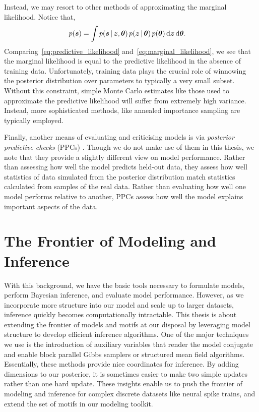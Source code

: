 Instead, we may resort to other methods of approximating the marginal
likelihood. Notice that,
\begin{align}
  \label{eq:marginal_likelihood}
  p(\boldsymbol{s})
  &= \int p(\boldsymbol{s} \,|\, \boldsymbol{z}, \boldsymbol{\theta}) \,
  p(\boldsymbol{z} \,|\, \boldsymbol{\theta}) \,
  p(\boldsymbol{\theta}) \,
  \mathrm{d}\boldsymbol{z} \, \mathrm{d} \boldsymbol{\theta}.
\end{align}
Comparing~\eqref{eq:predictive_likelihood} and~\eqref{eq:marginal_likelihood},
we see that the marginal likelihood is equal to the predictive likelihood
in the absence of training data. Unfortunately, training data plays the crucial
role of winnowing the posterior distribution over parameters to typically
a very small subset. Without this constraint, simple Monte Carlo estimates
like those used to approximate the predictive likelihood will suffer from
extremely high variance. Instead, more sophisticated methods, like annealed
importance sampling \cite{neal2001annealed} are typically employed. 

Finally, another means of evaluating and criticising models is via
\emph{posterior predictive checks} (PPCs) \cite{box1980sampling,
  Gelman13, blei2014build}.  Though we do not make use of them in this
thesis, we note that they provide a slightly different view on model
performance. Rather than assessing how well the model predicts
held-out data, they assess how well statistics of data simulated from
the posterior distribution match statistics calculated from samples of
the real data. Rather than evaluating how well one model performs
relative to another, PPCs assess how well the model explains important
aspects of the data.

\section{The Frontier of Modeling and Inference}
With this background, we have the basic tools necessary to formulate
models, perform Bayesian inference, and evaluate model performance.
However, as we incorporate more structure into our model and scale up
to larger datasets, inference quickly becomes computationally
intractable. This thesis is about extending the frontier of models and
motifs at our disposal by leveraging model structure to develop
efficient inference algorithms. One of the major techniques we use is
the introduction of auxiliary variables that render the model
conjugate and enable block parallel Gibbs samplers or structured mean
field algorithms. Essentially, these methods provide nice coordinates
for inference. By adding dimensions to our posterior, it is sometimes
easier to make two simple updates rather than one hard update.  These
insights enable us to push the frontier of modeling and inference for
complex discrete datasets like neural spike trains, and extend the
set of motifs in our modeling toolkit.
